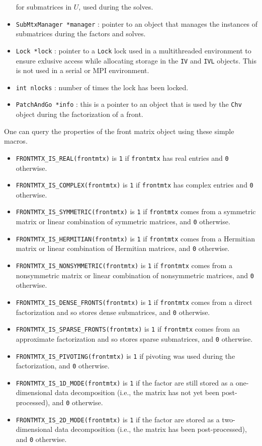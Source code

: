 \begin{itemize}
for submatrices in $U$, used during the solves.
\item
{\tt SubMtxManager *manager} : pointer to an object that manages
the instances of submatrices during the factors and solves.
\item
{\tt Lock *lock} : pointer to a {\tt Lock} lock used 
in a multithreaded environment to ensure exlusive access while
allocating storage in the {\tt IV} and {\tt IVL} objects.
This is not used in a serial or MPI environment.
\item
{\tt int nlocks} : number of times the lock has been locked.
\item
{\tt PatchAndGo *info} : this is a pointer to an object that is
used by the {\tt Chv} object during the factorization of a front.
\end{itemize}
\par
One can query the properties of the front matrix object 
using these simple macros.
\begin{itemize}
\item
{\tt FRONTMTX\_IS\_REAL(frontmtx)} is {\tt 1} if {\tt frontmtx} 
has real entries and {\tt 0} otherwise.
\item
{\tt FRONTMTX\_IS\_COMPLEX(frontmtx)} is {\tt 1} if {\tt frontmtx} 
has complex entries and {\tt 0} otherwise.
\item
{\tt FRONTMTX\_IS\_SYMMETRIC(frontmtx)} is {\tt 1} if {\tt frontmtx} 
comes from a symmetric matrix or linear combination of symmetric
matrices, and {\tt 0} otherwise.
\item
{\tt FRONTMTX\_IS\_HERMITIAN(frontmtx)} is {\tt 1} if {\tt frontmtx} 
comes from a Hermitian matrix or linear combination of Hermitian
matrices, and {\tt 0} otherwise.
\item
{\tt FRONTMTX\_IS\_NONSYMMETRIC(frontmtx)} is {\tt 1} if {\tt frontmtx} 
comes from a nonsymmetric matrix or linear combination of nonsymmetric
matrices, and {\tt 0} otherwise.
\item
{\tt FRONTMTX\_IS\_DENSE\_FRONTS(frontmtx)} is {\tt 1} 
if {\tt frontmtx} 
comes from a direct factorization and so stores dense submatrices,
and {\tt 0} otherwise.
\item
{\tt FRONTMTX\_IS\_SPARSE\_FRONTS(frontmtx)} is {\tt 1} 
if {\tt frontmtx} comes from an approximate factorization 
and so stores sparse submatrices, and {\tt 0} otherwise.
\item
{\tt FRONTMTX\_IS\_PIVOTING(frontmtx)} is {\tt 1} 
if pivoting was used during the factorization,
and {\tt 0} otherwise.
\item
{\tt FRONTMTX\_IS\_1D\_MODE(frontmtx)} is {\tt 1} 
if the factor are still stored as a one-dimensional data
decomposition (i.e., the matrix has not yet been post-processed),
and {\tt 0} otherwise.
\item
{\tt FRONTMTX\_IS\_2D\_MODE(frontmtx)} is {\tt 1} 
if the factor are stored as a two-dimensional data
decomposition (i.e., the matrix has been post-processed),
and {\tt 0} otherwise.
\end{itemize}
